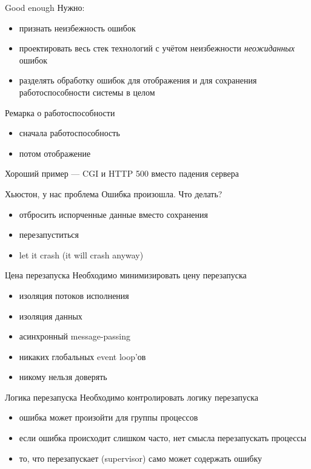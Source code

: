\documentclass[10pt]{beamer}
\begin{document}
\begin{frame}{Good enough}
  Нужно:
  \begin{itemize}
  \item признать неизбежность ошибок
  \item проектировать весь стек технологий с учётом неизбежности \emph{неожиданных} ошибок
  \item разделять обработку ошибок для отображения и для сохранения работоспособности системы в целом
  \end{itemize}
\end{frame}

\begin{frame}{Ремарка о работоспособности}
  \begin{itemize}
  \item сначала работоспособность
  \item потом отображение
  \end{itemize}
  Хороший пример — CGI и HTTP 500 вместо падения сервера
\end{frame}

\begin{frame}{Хьюстон, у нас проблема}
  Ошибка произошла. Что делать?
  \begin{itemize}
  \item отбросить испорченные данные вместо сохранения
  \item перезапуститься
  \item let it crash (it will crash anyway)
  \end{itemize}
\end{frame}

\begin{frame}{Цена перезапуска}
  Необходимо минимизировать цену перезапуска
  \begin{itemize}
  \item изоляция потоков исполнения
  \item изоляция данных
  \item асинхронный message-passing
  \item никаких глобальных event loop'ов
  \item никому нельзя доверять
  \end{itemize}
\end{frame}

\begin{frame}{Логика перезапуска}
  Необходимо контролировать логику перезапуска
  \begin{itemize}
  \item ошибка может произойти для группы процессов
  \item если ошибка происходит слишком часто, нет смысла перезапускать процессы
  \item то, что перезапускает (supervisor) само может содержать ошибку
  \end{itemize}
\end{frame}
\end{document}
